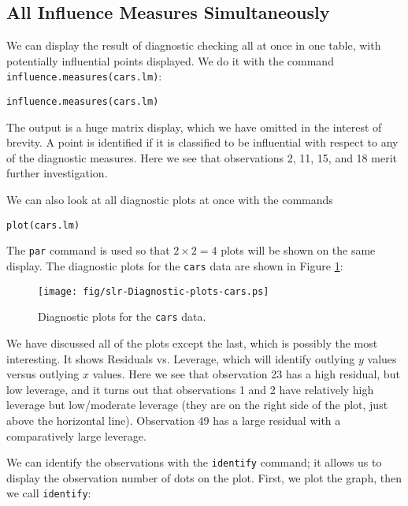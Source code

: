 \subsection{All Influence Measures Simultaneously}
\label{sec-11-5-5}

We can display the result of diagnostic checking all at once in one
table, with potentially influential points displayed. We do it with
the command \texttt{influence.measures(cars.lm)}:

\begin{verbatim}
influence.measures(cars.lm)
\end{verbatim}

The output is a huge matrix display, which we have omitted in the
interest of brevity. A point is identified if it is classified to be
influential with respect to any of the diagnostic measures. Here we
see that observations 2, 11, 15, and 18 merit further investigation.

We can also look at all diagnostic plots at once with the commands

\begin{verbatim}
plot(cars.lm)
\end{verbatim}

The \texttt{par} command is used so that \(2\times 2 = 4\) plots will be
shown on the same display. The diagnostic plots for the \texttt{cars} data
are shown in Figure \ref{fig-Diagnostic-plots-cars}:

\begin{figure}[ht!]
\centering
\texttt{[image: fig/slr-Diagnostic-plots-cars.ps]}
\caption[Diagnostic plots for the \texttt{cars} data]{\label{fig-Diagnostic-plots-cars}\small Diagnostic plots for the \texttt{cars} data.}
\end{figure}

We have discussed all of the plots except the last, which is possibly
the most interesting. It shows Residuals vs. Leverage, which will
identify outlying \(y\) values versus outlying \(x\) values. Here we
see that observation 23 has a high residual, but low leverage, and it
turns out that observations 1 and 2 have relatively high leverage but
low/moderate leverage (they are on the right side of the plot, just
above the horizontal line). Observation 49 has a large residual with a
comparatively large leverage.

We can identify the observations with the \texttt{identify} command; it
allows us to display the observation number of dots on the
plot. First, we plot the graph, then we call \texttt{identify}:

